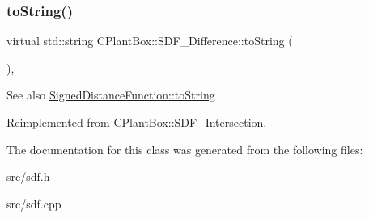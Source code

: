 \subsubsection{\texorpdfstring{to\+String()}{toString()}}
{\footnotesize\ttfamily virtual std\+::string C\+Plant\+Box\+::\+S\+D\+F\+\_\+\+Difference\+::to\+String (\begin{DoxyParamCaption}{ }\end{DoxyParamCaption})\hspace{0.3cm}{\ttfamily [inline]}, {\ttfamily [virtual]}}

\begin{DoxySeeAlso}{See also}
\hyperlink{classCPlantBox_1_1SignedDistanceFunction_a9f375961d9a24b06dc669ac67aa16fa6}{Signed\+Distance\+Function\+::to\+String} 
\end{DoxySeeAlso}


Reimplemented from \hyperlink{classCPlantBox_1_1SDF__Intersection_ae095150852cdaedec026b4dea1f87c40}{C\+Plant\+Box\+::\+S\+D\+F\+\_\+\+Intersection}.



The documentation for this class was generated from the following files\+:\begin{DoxyCompactItemize}
\item 
src/sdf.\+h\item 
src/sdf.\+cpp\end{DoxyCompactItemize}
